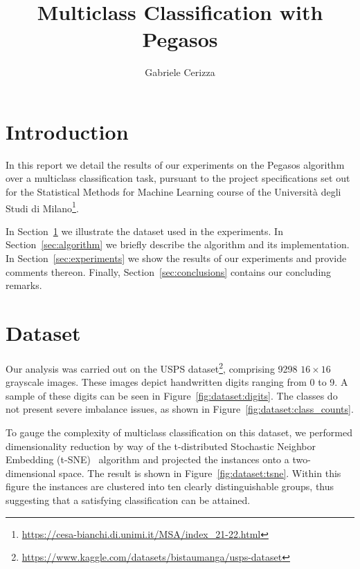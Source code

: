 \documentclass[runningheads]{llncs}
\begin{document}
\title{
    Multiclass Classification with Pegasos
}
\author{Gabriele Cerizza}


\maketitle

\section*{Introduction}
\label{sec:introduction}

In this report we detail the results of our experiments on the Pegasos algorithm~\cite{shalev-pegasos-2011} over a multiclass classification task, pursuant to the project specifications set out for the Statistical Methods for Machine Learning course of the Università degli Studi di Milano\footnote{\url{https://cesa-bianchi.di.unimi.it/MSA/index\_21-22.html}}. 

In Section~\ref{sec:dataset} we illustrate the dataset used in the experiments. In Section~\ref{sec:algorithm} we briefly describe the algorithm and its implementation. In Section~\ref{sec:experiments} we show the results of our experiments and provide comments thereon. Finally, Section~\ref{sec:conclusions} contains our concluding remarks. 

\section{Dataset}
\label{sec:dataset}

Our analysis was carried out on the USPS dataset\footnote{\url{https://www.kaggle.com/datasets/bistaumanga/usps-dataset}}, comprising 9298 $16 \times 16$ grayscale images. These images depict handwritten digits ranging from 0 to 9. A sample of these digits can be seen in Figure~\ref{fig:dataset:digits}. The classes do not present severe imbalance issues, as shown in Figure~\ref{fig:dataset:class_counts}.

To gauge the complexity of multiclass classification on this dataset, we performed dimensionality reduction by way of the t-distributed Stochastic Neighbor Embedding (t-SNE)~\cite{maaten-2008-tsne} algorithm and projected the instances onto a two-dimensional space. The result is shown in Figure~\ref{fig:dataset:tsne}. Within this figure the instances are clustered into ten clearly distinguishable groups, thus suggesting that a satisfying classification can be attained.   
\end{document}
